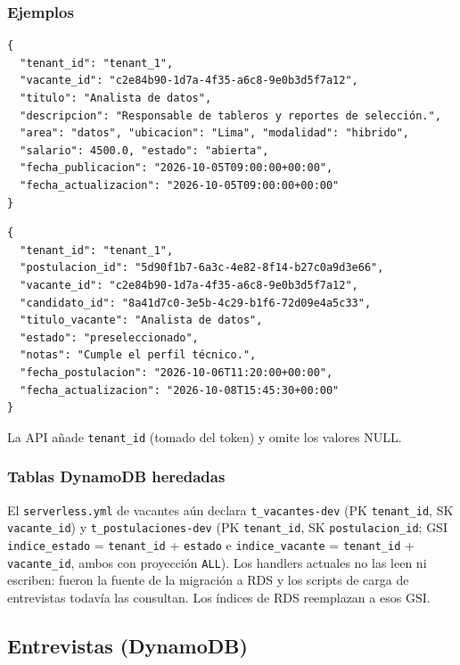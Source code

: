\subsubsection{Ejemplos}
\begin{lstlisting}
{
  "tenant_id": "tenant_1",
  "vacante_id": "c2e84b90-1d7a-4f35-a6c8-9e0b3d5f7a12",
  "titulo": "Analista de datos",
  "descripcion": "Responsable de tableros y reportes de selección.",
  "area": "datos", "ubicacion": "Lima", "modalidad": "hibrido",
  "salario": 4500.0, "estado": "abierta",
  "fecha_publicacion": "2026-10-05T09:00:00+00:00",
  "fecha_actualizacion": "2026-10-05T09:00:00+00:00"
}
\end{lstlisting}

\begin{lstlisting}
{
  "tenant_id": "tenant_1",
  "postulacion_id": "5d90f1b7-6a3c-4e82-8f14-b27c0a9d3e66",
  "vacante_id": "c2e84b90-1d7a-4f35-a6c8-9e0b3d5f7a12",
  "candidato_id": "8a41d7c0-3e5b-4c29-b1f6-72d09e4a5c33",
  "titulo_vacante": "Analista de datos",
  "estado": "preseleccionado",
  "notas": "Cumple el perfil técnico.",
  "fecha_postulacion": "2026-10-06T11:20:00+00:00",
  "fecha_actualizacion": "2026-10-08T15:45:30+00:00"
}
\end{lstlisting}

La API añade \texttt{tenant\_\allowbreak{}id} (tomado del token) y omite los valores NULL.

\subsubsection{Tablas DynamoDB heredadas}
El \texttt{serverless.yml} de vacantes aún declara \texttt{t\_\allowbreak{}vacantes-\allowbreak{}dev} (PK \texttt{tenant\_\allowbreak{}id}, SK \texttt{vacante\_\allowbreak{}id}) y \texttt{t\_\allowbreak{}postulaciones-\allowbreak{}dev} (PK \texttt{tenant\_\allowbreak{}id}, SK \texttt{postulacion\_\allowbreak{}id}; GSI \texttt{indice\_\allowbreak{}estado} = \texttt{tenant\_\allowbreak{}id} + \texttt{estado} e \texttt{indice\_\allowbreak{}vacante} = \texttt{tenant\_\allowbreak{}id} + \texttt{vacante\_\allowbreak{}id}, ambos con proyección \texttt{ALL}). Los handlers actuales no las leen ni escriben: fueron la fuente de la migración a RDS y los scripts de carga de entrevistas todavía las consultan. Los índices de RDS reemplazan a esos GSI.

\subsection{Entrevistas (DynamoDB)}
